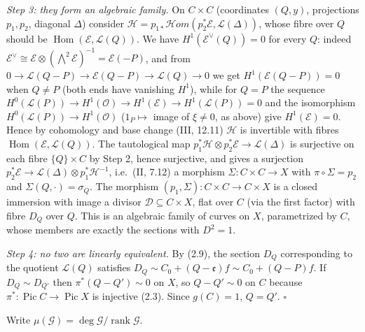 \documentclass[11pt]{article}
\begin{document}
\emph{Step 3: they form an algebraic family.} On $C\times C$ (coordinates $(Q,y)$, projections $p_1,p_2$, diagonal $\Delta$) consider $\mathcal H=p_{1*}\mathcal{H}om(p_2^*\mathcal E,\mathcal L(\Delta))$, whose fibre over $Q$ should be $\operatorname{Hom}(\mathcal E,\mathcal L(Q))$. We have $H^1(\mathcal E^\vee(Q))=0$ for every $Q$: indeed $\mathcal E^\vee\cong\mathcal E\otimes(\bigwedge^2\mathcal E)^{-1}=\mathcal E(-P)$, and from $0\to\mathcal L(Q-P)\to\mathcal E(Q-P)\to\mathcal L(Q)\to0$ we get $H^1(\mathcal E(Q-P))=0$ when $Q\ne P$ (both ends have vanishing $H^1$), while for $Q=P$ the sequence $H^0(\mathcal L(P))\to H^1(\mathcal O)\to H^1(\mathcal E)\to H^1(\mathcal L(P))=0$ and the isomorphism $H^0(\mathcal L(P))\to H^1(\mathcal O)$ ($1_P\mapsto$ image of $\xi\ne0$, as above) give $H^1(\mathcal E)=0$. Hence by cohomology and base change (III, 12.11) $\mathcal H$ is invertible with fibres $\operatorname{Hom}(\mathcal E,\mathcal L(Q))$. The tautological map $p_1^*\mathcal H\otimes p_2^*\mathcal E\to\mathcal L(\Delta)$ is surjective on each fibre $\{Q\}\times C$ by Step 2, hence surjective, and gives a surjection $p_2^*\mathcal E\to\mathcal L(\Delta)\otimes p_1^*\mathcal H^{-1}$, i.e.\ (II, 7.12) a morphism $\Sigma\colon C\times C\to X$ with $\pi\circ\Sigma=p_2$ and $\Sigma(Q,\cdot)=\sigma_Q$. The morphism $(p_1,\Sigma)\colon C\times C\to C\times X$ is a closed immersion with image a divisor $\mathcal D\subseteq C\times X$, flat over $C$ (via the first factor) with fibre $D_Q$ over $Q$. This is an algebraic family of curves on $X$, parametrized by $C$, whose members are exactly the sections with $D^2=1$.

\emph{Step 4: no two are linearly equivalent.} By (2.9), the section $D_Q$ corresponding to the quotient $\mathcal L(Q)$ satisfies $D_Q\sim C_0+(Q-\mathfrak e)f\sim C_0+(Q-P)f$. If $D_Q\sim D_{Q'}$ then $\pi^*(Q-Q')\sim0$ on $X$, so $Q-Q'\sim0$ on $C$ because $\pi^*\colon\operatorname{Pic}C\to\operatorname{Pic}X$ is injective (2.3). Since $g(C)=1$, $Q=Q'$. \hfill$\square$

\pf
Write $\mu(\mathcal G)=\deg\mathcal G/\operatorname{rank}\mathcal G$.
\end{document}
